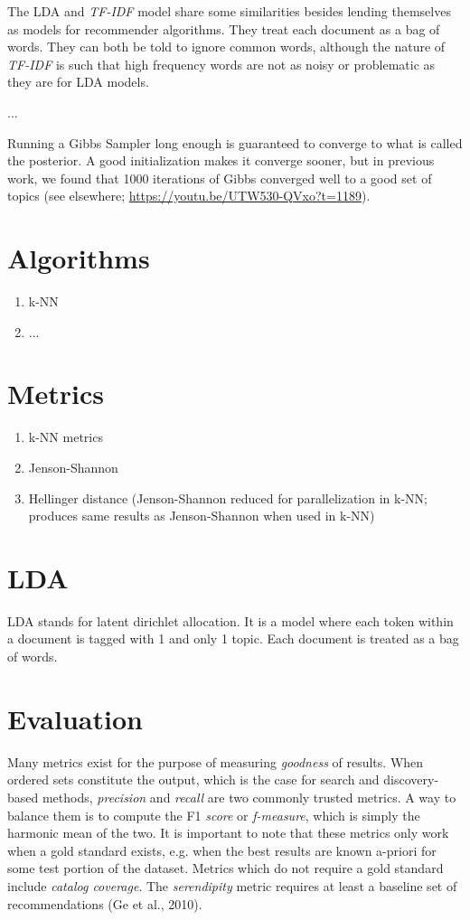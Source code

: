 The LDA and \emph{TF-IDF} model share some similarities besides lending themselves as models for recommender algorithms. They treat each document as a bag of words. They can both be told to ignore common words, although the nature of \emph{TF-IDF} is such that high frequency words are not as noisy or problematic as they are for LDA models.

...

Running a Gibbs Sampler long enough is guaranteed to converge to what is called the posterior. A good initialization makes it converge sooner, but in previous work, we found that 1000 iterations of Gibbs converged well to a good set of topics (see elsewhere; \url{https://youtu.be/UTW530-QVxo?t=1189}).

\section{Algorithms}
\begin{enumerate}
  \item k-NN
  \item ...
\end{enumerate}

\section{Metrics}
\begin{enumerate}
  \item k-NN metrics
  \item Jenson-Shannon
  \item Hellinger distance (Jenson-Shannon reduced for parallelization in k-NN; produces same results as Jenson-Shannon when used in k-NN)
\end{enumerate}

\section{LDA}
LDA stands for latent dirichlet allocation. It is a model where each token within a document is tagged with 1 and only 1 topic. Each document is treated as a bag of words.

\section{Evaluation}

Many metrics exist for the purpose of measuring \textit{goodness} of results. When ordered sets constitute the output, which is the case for search and discovery-based methods, \textit{precision} and \textit{recall} are two commonly trusted metrics. A way to balance them is to compute the F1 \textit{score} or \textit{f-measure}, which is simply the harmonic mean of the two. It is important to note that these metrics only work when a gold standard exists, e.g. when the best results are known a-priori for some test portion of the dataset. Metrics which do not require a gold standard include \textit{catalog coverage}. The \textit{serendipity} metric requires at least a baseline set of recommendations (Ge et al., 2010).

